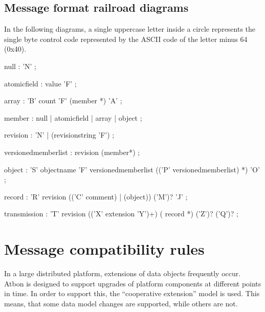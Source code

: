 \documentclass[11pt,a4paper,oneside]{article}
\begin{document}
\vspace{8mm}

\subsection{Message format railroad diagrams}
In the following diagrams, a single uppercase letter inside a circle represents the single byte control code represented by the ASCII code of the letter minus 64 (0x40).



\begin{rail}
null : 'N'
    ;

atomicfield : value 'F'
    ;

array :
    'B' count 'F' (member *) 'A'
    ;

member : null | atomicfield | array | object
    ;

revision : 'N' | (revisionstring 'F')
    ;

\end{rail}

\begin{rail}
versionedmemberlist :
    revision (member*)
    ;
\end{rail}

\begin{rail}
object :
    'S' objectname 'F' versionedmemberlist
          (('P' versionedmemberlist) *)
    'O'
    ;
\end{rail}

\begin{rail}
record :
    'R' revision
                          (('C' comment) | (object))
                                                    ('M')? 'J'
    ;
\end{rail}

\begin{rail}
transmission :
    'T' revision
    (('X' extension 'Y')+)
    ( record *)
    ('Z')?
    ('Q')?
    ;
\end{rail}

\vspace{8mm}


\section{Message compatibility rules}
In a large distributed platform, extensions of data objects frequently occur. Atbon is designed to support upgrades of platform
components at different points in time. In order to support this, the
``cooperative extension'' model is used. This means, that some data model changes are supported, while others are not.
\end{document}
